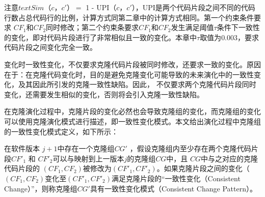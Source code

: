   
注意$\mathit {textSim}（c，c'）= $ 1 - UPI（$ c，c'$），UPI是两个代码片段之间不同的代码行数占总代码行的比例，计算方式同第二章中的计算方式相同。第一个约束条件要求 $ CF_1 $和$CF_2 $同时修改；第二个约束条要求$ CF_1 $和$CF_2$发生满足阈值$\tau$条件下一致性的变化，即对代码片段进行了非常相似且一致的变化。本章中$\tau$取值为$0.003$，要求代码片段之间变化完全一致。

变化时一致性变化，不仅要求克隆代码片段被同时修改，还要求一致的变化。原因在于：在克隆代码变化时，目的是避免克隆变化可能导致的未来演化中的一致性变化，及其因此所引发的克隆一致性缺陷。因此， 不仅要求两个克隆代码片段同时变化，还需要发生相似的变化，否则将会引入克隆一致性缺陷。

在克隆演化过程中，克隆片段的变化必然也会导致克隆组的变化，而克隆组的变化可以使用克隆演化模式进行描述，即一致性变化模式。本文给出演化过程中克隆组的一致性变化模式定义，如下所示：\\

\begin{definition}
\label{def-changingpattern}
在软件版本 $j+1$中存在一个克隆组$CG'$ ，假设克隆组内至少存在两个克隆代码片段$CF'_1$ 和 $CF'_2$可以与映射到上一版本$j$的克隆组$CG$中，且 $CG$中与之对应的克隆代码片段的 $(CF_1,CF_2)$被修改为$(CF'_1,CF'_2)$。如果克隆片段之间的变化（ $(CF_1,CF_2)$变化至$(CF'_1,CF'_2)$满足克隆片段的“一致性变化（Consistent Change）”，则称克隆组$CG'$具有一致性变化模式（Consistent Change Pattern）。
\end{definition}


